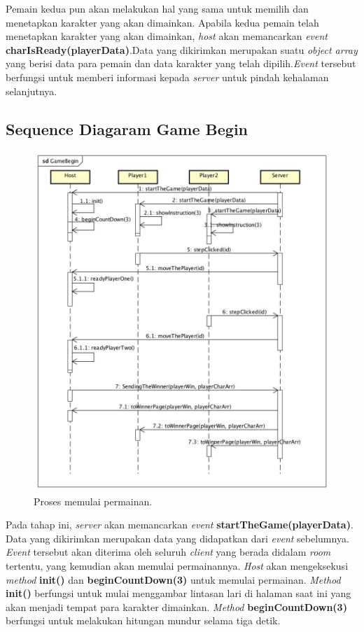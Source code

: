 Pemain kedua pun akan melakukan hal yang sama untuk memilih dan menetapkan karakter yang akan dimainkan. Apabila kedua pemain telah menetapkan karakter yang akan dimainkan, \textit{host} akan memancarkan \textit{event} \textbf{charIsReady(playerData)}.Data yang dikirimkan merupakan suatu \textit{object array} yang berisi data para pemain dan data karakter yang telah dipilih.\textit{Event} tersebut berfungsi untuk memberi informasi kepada \textit{server} untuk pindah kehalaman selanjutnya.

\subsection{Sequence Diagaram Game Begin}

\begin{figure}[H]
	\centering
	\includegraphics[scale=0.3]{Gambar/GameBegin}
	\caption{Proses memulai permainan.}
	\label{fig:3_GameBegin}
\end{figure}

Pada tahap ini, \textit{server} akan memancarkan \textit{event} \textbf{startTheGame(playerData)}. Data yang dikirimkan merupakan data yang didapatkan dari \textit{event} sebelumnya. \textit{Event} tersebut akan diterima oleh seluruh \textit{client} yang berada didalam \textit{room} tertentu, yang kemudian akan memulai permainannya. \textit{Host} akan mengeksekusi \textit{method} \textbf{init()} dan \textbf{beginCountDown(3)} untuk memulai permainan. \textit{Method} \textbf{init()} berfungsi untuk mulai menggambar lintasan lari di halaman saat ini yang akan menjadi tempat para karakter dimainkan. \textit{Method} \textbf{beginCountDown(3)} berfungsi untuk melakukan hitungan mundur selama tiga detik. 

